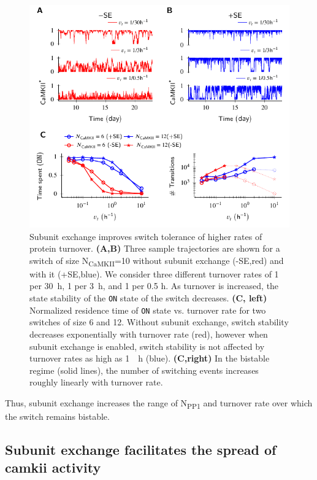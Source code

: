 \documentclass[9pt,lineno,doublespacing]{elife}
\newcommand\SUB[2]{#1\textsubscript{#2}}
\begin{document}
\begin{figure}[t]
    \includegraphics[width=114mm]{./PaperFigures/elifeFigure3/figure_turnover_tolerance_114.pdf}
    \caption{Subunit exchange improves switch tolerance of higher rates of
        protein turnover.
        \textbf{(A,B)} Three sample trajectories are shown for a switch of 
        size \SUB{N}{CaMKII}=10 without subunit exchange
        (-SE,red) and with it (+SE,blue). We consider three different 
        turnover rates of 1 per \SI{30}{\hour}, 1 per \SI{3}{\hour}, 
        and 1 per 0.5 \si{\hour}. As turnover is increased, the state stability 
        of the \texttt{ON} state of the switch decreases.
        \textbf{(C, left)} Normalized residence time of \texttt{ON} state vs. turnover
        rate for two switches of size 6 and 12. Without subunit exchange, switch
        stability decreases exponentially with turnover rate (red), however when
        subunit exchange is enabled, switch stability is not affected by
        turnover rates as high as \SI{1}{\per \hour} (blue). \textbf{(C,right)} In
        the bistable regime (solid lines), the number of switching events increases roughly
        linearly with turnover rate.
    }\label{fig:turnover}
\end{figure}

Thus, subunit exchange increases the range of \SUB{N}{PP1} and turnover rate 
over which the switch remains bistable. 

\subsection{Subunit exchange facilitates the spread of \gls{camkii}
activity}\label{res:spread_activity}
\end{document}
